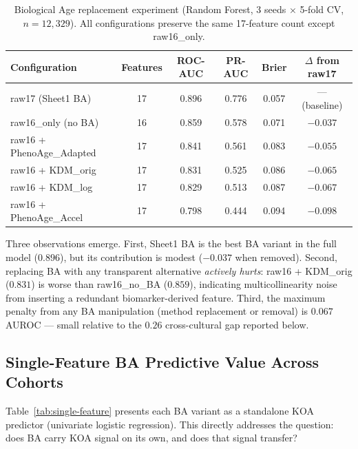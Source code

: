 \documentclass[11pt,a4paper]{article}
\begin{document}
\begin{table}[h!]
\centering
\small
\caption{Biological Age replacement experiment (Random Forest, 3 seeds $\times$ 5-fold CV,
$n=12{,}329$). All configurations preserve the same 17-feature count except raw16\_only.}
\label{tab:ba-replace}
\begin{tabular}{lccccc}
\toprule
Configuration & Features & ROC-AUC & PR-AUC & Brier & $\Delta$ from raw17 \\
\midrule
raw17 (Sheet1 BA)       & 17 & 0.896 & 0.776 & 0.057 & --- (baseline) \\
raw16\_only (no BA)     & 16 & 0.859 & 0.578 & 0.071 & $-0.037$ \\
raw16 + PhenoAge\_Adapted & 17 & 0.841 & 0.561 & 0.083 & $-0.055$ \\
raw16 + KDM\_orig       & 17 & 0.831 & 0.525 & 0.086 & $-0.065$ \\
raw16 + KDM\_log        & 17 & 0.829 & 0.513 & 0.087 & $-0.067$ \\
raw16 + PhenoAge\_Accel & 17 & 0.798 & 0.444 & 0.094 & $-0.098$ \\
\bottomrule
\end{tabular}
\end{table}

Three observations emerge. First, Sheet1 BA is the best BA variant in the full model
($0.896$), but its contribution is modest ($-0.037$ when removed). Second, replacing BA
with any transparent alternative \emph{actively hurts}: raw16 + KDM\_orig ($0.831$) is
worse than raw16\_no\_BA ($0.859$), indicating multicollinearity noise from inserting a
redundant biomarker-derived feature. Third, the maximum penalty from any BA manipulation
(method replacement or removal) is $0.067$ AUROC --- small relative to the $0.26$
cross-cultural gap reported below.

\subsection{Single-Feature BA Predictive Value Across Cohorts}
\label{sec:single-feature}

Table~\ref{tab:single-feature} presents each BA variant as a standalone KOA predictor
(univariate logistic regression). This directly addresses the question: does BA carry
KOA signal on its own, and does that signal transfer?
\end{document}
